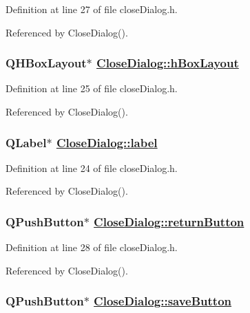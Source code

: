 Definition at line 27 of file close\-Dialog.h.

Referenced by Close\-Dialog().\hypertarget{classCloseDialog_r2}{
\subsubsection[hBoxLayout]{\setlength{\rightskip}{0pt plus 5cm}QHBox\-Layout$\ast$ \hyperlink{classCloseDialog_r2}{Close\-Dialog::h\-Box\-Layout}}}
\label{classCloseDialog_r2}


Definition at line 25 of file close\-Dialog.h.

Referenced by Close\-Dialog().\hypertarget{classCloseDialog_r1}{
\subsubsection[label]{\setlength{\rightskip}{0pt plus 5cm}QLabel$\ast$ \hyperlink{classCloseDialog_r1}{Close\-Dialog::label}}}
\label{classCloseDialog_r1}


Definition at line 24 of file close\-Dialog.h.

Referenced by Close\-Dialog().\hypertarget{classCloseDialog_r5}{
\subsubsection[returnButton]{\setlength{\rightskip}{0pt plus 5cm}QPush\-Button$\ast$ \hyperlink{classCloseDialog_r5}{Close\-Dialog::return\-Button}}}
\label{classCloseDialog_r5}


Definition at line 28 of file close\-Dialog.h.

Referenced by Close\-Dialog().\hypertarget{classCloseDialog_r3}{
\subsubsection[saveButton]{\setlength{\rightskip}{0pt plus 5cm}QPush\-Button$\ast$ \hyperlink{classCloseDialog_r3}{Close\-Dialog::save\-Button}}}
\label{classCloseDialog_r3}


